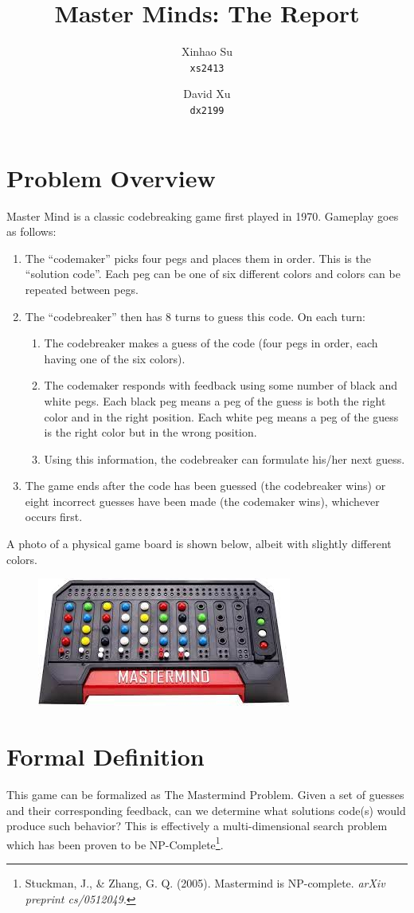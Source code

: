 \documentclass{article}
\title{Master Minds: The Report}
\author{
	Xinhao Su\\
	\texttt{xs2413}
	\and
	David Xu\\
	\texttt{dx2199}
}
\begin{document}
\maketitle
\section{Problem Overview}
Master Mind is a classic codebreaking game first played in 1970. Gameplay goes as follows:
\begin{enumerate}
	\item The ``codemaker'' picks four pegs and places them in order. This is the ``solution code''. Each peg can be one of six different colors and colors can be repeated between pegs.
	\item The ``codebreaker'' then has 8 turns to guess this code. On each turn:
	\begin {enumerate}
		\item The codebreaker makes a guess of the code (four pegs in order, each having one of the six colors).
		\item The codemaker responds with feedback using some number of black and white pegs. Each black peg means a peg of the guess is both the right color and in the right position. Each white peg means a peg of the guess is the right color but in the wrong position.
		\item Using this information, the codebreaker can formulate his/her next guess.
	\end{enumerate}
	\item The game ends after the code has been guessed (the codebreaker wins) or eight incorrect guesses have been made (the codemaker wins), whichever occurs first.
\end{enumerate}

A photo of a physical game board is shown below, albeit with slightly different colors.
\begin{figure}[h]
	\centering
	\includegraphics{mm.jpeg}
\end{figure}


\section{Formal Definition}
This game can be formalized as The Mastermind Problem. Given a set of guesses and their corresponding feedback, can we determine what solutions code(s) would produce such behavior? This is effectively a multi-dimensional search problem which has been proven to be NP-Complete\footnote{Stuckman, J., \& Zhang, G. Q. (2005). Mastermind is NP-complete. \textit{arXiv preprint cs/0512049}.}.
\end{document}
